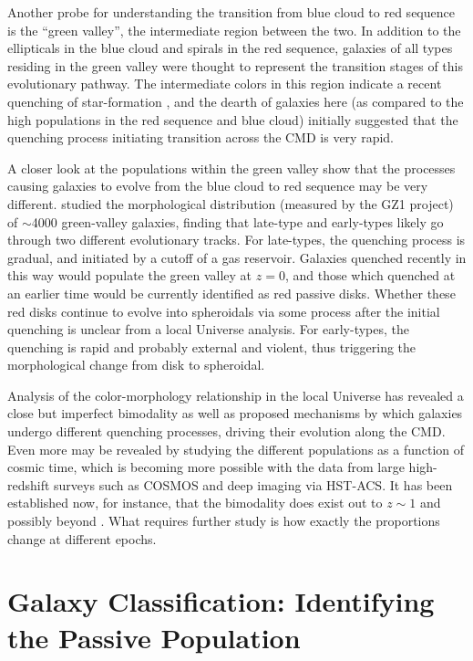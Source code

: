 Another probe for understanding the transition from blue cloud to red sequence is the ``green valley'', the intermediate region between the two. In addition to the ellipticals in the blue cloud and spirals in the red sequence, galaxies of all types residing in the green valley were thought to represent the transition stages of this evolutionary pathway. The intermediate colors in this region indicate a recent quenching of star-formation \citep{Martin2007,Salim2007}, and the dearth of galaxies here (as compared to the high populations in the red sequence and blue cloud) initially suggested that the quenching process initiating transition across the CMD is very rapid.

A closer look at the populations within the green valley show that the processes causing galaxies to evolve from the blue cloud to red sequence may be very different. \citet{Schawinski2009} studied the morphological distribution (measured by the GZ1 project) of $\sim$4000 green-valley galaxies, finding that late-type and early-types likely go through two different evolutionary tracks. For late-types, the quenching process is gradual, and initiated by a cutoff of a gas reservoir. Galaxies quenched recently in this way would populate the green valley at $z=0$, and those which quenched at an earlier time would be currently identified as red passive disks. Whether these red disks continue to evolve into spheroidals via some process after the initial quenching is unclear from a local Universe analysis. For early-types, the quenching is rapid and probably external and violent, thus triggering the morphological change from disk to spheroidal.  

Analysis of the color-morphology relationship in the local Universe has revealed a close but imperfect bimodality as well as proposed mechanisms by which galaxies undergo different quenching processes, driving their evolution along the CMD. Even more may be revealed by studying the different populations as a function of cosmic time, which is becoming more possible with the data from large high-redshift surveys such as COSMOS and deep imaging via HST-ACS. It has been established now, for instance, that the bimodality does exist out to $z\sim1$ \citep{Bell2004,Cirasuolo2007,Mignoli2009} and possibly beyond \citep{Giallongo2005,VanDokkum2006,Franzetti2007,Cassata2008}. What requires further study is how exactly the proportions change at different epochs.


\section{Galaxy Classification: Identifying the Passive Population}

